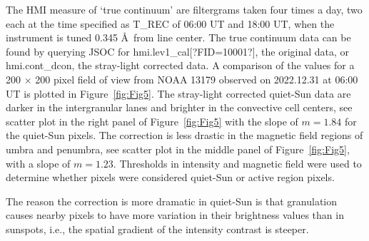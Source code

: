 \documentclass[trackchanges]{aastex62}
\begin{document}
The HMI measure of `true continuum' are filtergrams taken four times a day, two each at the time specified as T\_REC of 06:00 UT and 18:00 UT, when the instrument is tuned 0.345 \AA~from line center. The true continuum data can be found by querying JSOC for hmi.lev1\_cal[?FID=10001?], the original data, or hmi.cont\_dcon, the stray-light corrected data. A comparison of the values for a 200 $\times$ 200 pixel field of view from NOAA 13179 observed on 2022.12.31 at 06:00 UT is plotted in Figure~\ref{fig:Fig5}. The stray-light corrected quiet-Sun data are darker in the intergranular lanes and brighter in the convective cell centers, see scatter plot in the right panel of Figure~\ref{fig:Fig5} with the slope of $m=1.84$ for the quiet-Sun pixels. The correction is less drastic in the magnetic field regions of umbra and penumbra, see scatter plot in the middle panel of Figure~\ref{fig:Fig5}, with a slope of $m=1.23$. Thresholds in intensity and magnetic field  were used to determine whether pixels were considered quiet-Sun or active region pixels. 

The reason the correction is more dramatic in quiet-Sun is that granulation causes nearby pixels to have more variation in their brightness values than in sunspots, i.e., the spatial gradient of the intensity contrast is steeper.  
\end{document}
